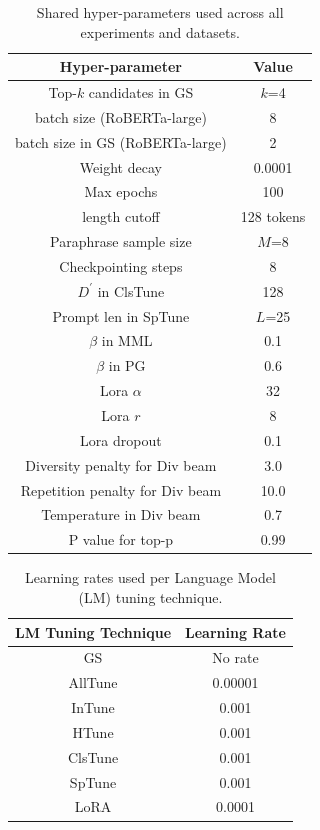 \documentclass[11pt]{article}
\begin{document}
\begin{table}[t]
\centering
\caption{Shared hyper-parameters used across all experiments and datasets.}
\begin{tabular}{ c | c }
\hline
Hyper-parameter & Value\\
\hline
Top-$k$ candidates in GS & $k$=4 \\
batch size (RoBERTa-large) & 8 \\
batch size in GS (RoBERTa-large) & 2 \\
Weight decay & 0.0001 \\
Max epochs & 100 \\
length cutoff & 128 tokens \\
Paraphrase sample size & $M$=8 \\
Checkpointing steps & 8 \\
$D^{'}$ in ClsTune & 128 \\
Prompt len in SpTune & $L$=25 \\
$\beta$ in MML & 0.1 \\
$\beta$ in PG & 0.6 \\
Lora $\alpha$ & 32 \\
Lora $r$ & 8 \\
Lora dropout & 0.1 \\
Diversity penalty for Div beam & 3.0 \\
Repetition penalty for Div beam & 10.0 \\
Temperature in Div beam & 0.7 \\
P value for top-p & 0.99
\end{tabular}
\label{hyper-parameters}
\end{table}

\begin{table}[t]
\centering
\caption{Learning rates used per Language Model (LM) tuning technique.}
\begin{tabular}{ c | c }
\hline
LM Tuning Technique & Learning Rate\\
\hline
GS & No rate \\
AllTune & 0.00001 \\
InTune &  0.001 \\
HTune & 0.001 \\
ClsTune & 0.001 \\
SpTune & 0.001 \\
LoRA & 0.0001
\end{tabular}
\label{learning-rates}
\end{table}
\end{document}
